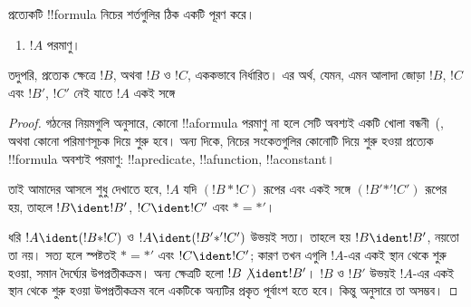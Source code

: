 \documentclass[../../../include/open-logic-section]{subfiles}
\begin{document}
\begin{prop}[একক পাঠযোগ্যতা]
প্রত্যেকটি !!{formula} নিচের শর্তগুলির ঠিক একটি পূরণ করে।
\begin{enumerate}
\item $!A$ পরমাণু।







\end{enumerate}
তদুপরি, প্রত্যেক ক্ষেত্রে $!B$, অথবা $!B$ ও $!C$, এককভাবে নির্ধারিত।
এর অর্থ, যেমন, এমন আলাদা জোড়া $!B$, $!C$ এবং $!B'$, $!C'$ নেই যাতে
$!A$ একই সঙ্গে
\end{prop}

\begin{proof}
গঠনের নিয়মগুলি অনুসারে, কোনো !!a{formula} পরমাণু না হলে সেটি অবশ্যই
একটি খোলা বন্ধনী~(,  অথবা কোনো পরিমাণসূচক
দিয়ে শুরু হবে। অন্য দিকে, নিচের সংকেতগুলির কোনোটি দিয়ে শুরু হওয়া
প্রত্যেক !!{formula} অবশ্যই পরমাণু: !!a{predicate}, !!a{function},
!!a{constant}।

তাই আমাদের আসলে শুধু দেখাতে হবে, $!A$ যদি $(!B \ast !C)$ রূপের এবং
একই সঙ্গে $(!B' \mathbin{\ast'} !C')$ রূপের হয়, তাহলে $!B \ident
!B'$, $!C \ident !C'$ এবং $\ast = {\ast'}$।

ধরি $!A \ident (!B \ast !C)$ ও $!A \ident (!B'
\mathbin{\ast'} !C')$ উভয়ই সত্য। তাহলে হয় $!B \ident !B'$, নয়তো তা
নয়। সত্য হলে স্পষ্টতই $\ast = {\ast'}$ এবং $!C \ident !C'$; কারণ
তখন এগুলি $!A$-এর একই স্থান থেকে শুরু হওয়া, সমান দৈর্ঘ্যের
উপপ্রতীকক্রম। অন্য ক্ষেত্রটি হলো $!B \not\ident !B'$। $!B$ ও $!B'$
উভয়ই $!A$-এর একই স্থান থেকে শুরু হওয়া উপপ্রতীকক্রম বলে একটিকে অন্যটির
প্রকৃত পূর্বাংশ হতে হবে। কিন্তু  অনুসারে তা অসম্ভব।
\end{proof}
\end{document}
